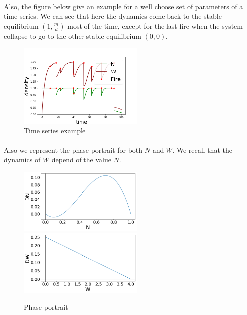 \documentclass{article}
\begin{document}
\paragraph{}
Also, the figure below give an example for a well choose set of parameters of a time series. We can see that here the dynamics come back to the stable equilibrium $(1, \frac{m}{d})$ most of the time, except for the last fire when the system collapse to go to the other stable equilibrium $(0, 0)$. %

\begin{figure}[h!]
\centering
\includegraphics[width=6cm]{return_between_2.png}
\caption{Time series example}
\end{figure}


\paragraph{}
Also we represent the phase portrait for both $N$ and $W$. We recall that the dynamics of $W$ depend of the value $N$. 

\begin{figure}[h!]
\centering
\includegraphics[width=6cm]{phase_N.png}
\includegraphics[width=6cm]{phase_W.png}
\caption{Phase portrait}
\end{figure}
\end{document}
